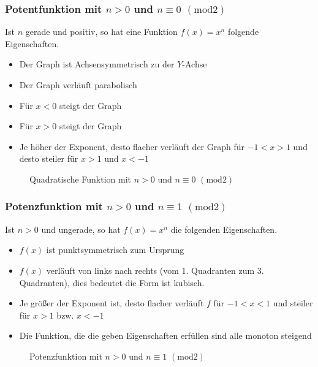 \subsubsection{Potentfunktion mit $n>0 $ und $ n\equiv0$ $(\mathrm{mod}2)$}
Ist $n$ gerade und positiv, so hat eine Funktion $f(x)=x	^n$ folgende Eigenschaften.
\begin{itemize}
	\item Der Graph ist Achsensymmetrisch zu der $Y$-Achse
	\item Der Graph verläuft parabolisch
	\item Für $x<0$ steigt der Graph
	\item Für $x>0$ steigt der Graph
	\item Je höher der Exponent, desto flacher verläuft der Graph für $-1<x>1$ und desto steiler für $x>1$ und $x<-1$
\end{itemize}
\begin{figure}[h]
\centering
{}
\caption{Quadratische Funktion mit $n>0$ und $ n\equiv0$ $(\mathrm{mod}2)$}
\end{figure}
\subsubsection{Potenzfunktion mit $n>0$ und $ n\equiv1$ $(\mathrm{mod}2)$}
Ist $n>0$ und ungerade, so hat $f(x)=x^n$ die folgenden Eigenschaften.
\begin{itemize}
	\item $f(x)$ ist punktsymmetrisch zum Ursprung
	\item $f(x)$ verläuft von links nach rechts (vom 1. Quadranten zum 3. Quadranten), dies bedeutet die Form ist kubisch. %
	\item Je größer der Exponent ist, desto flacher verläuft $f$ für $-1<x<1$ und steiler für $x>1$ bzw. $x<-1$
	\item Die Funktion, die die geben Eigenschaften erfüllen sind alle monoton steigend
\end{itemize}
\begin{figure}[h]
\centering
{}
\caption{Potenzfunktion mit $n>0$ und $ n\equiv1$ $(\mathrm{mod}2)$}
\end{figure}
